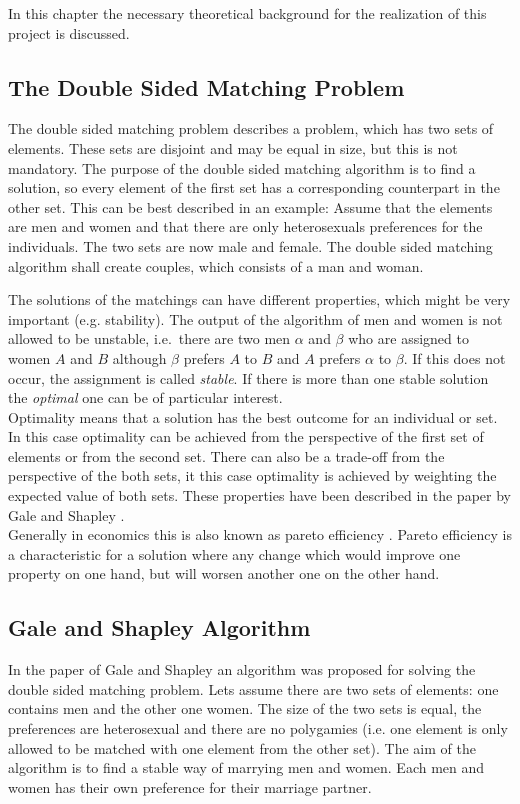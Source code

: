 \label{theory}
In this chapter the necessary theoretical background for the realization of this project is discussed.

\subsection{The Double Sided Matching Problem}
The double sided matching problem describes a problem, which has two sets of elements.
These sets are disjoint and may be equal in size, but this is not mandatory.
The purpose of the double sided matching algorithm is to find a solution, so every element of the first set has a corresponding counterpart in the other set. This can be best described in an example:
Assume that the elements are men and women and that there are only heterosexuals preferences for the individuals.
The two sets are now male and female.
The double sided matching algorithm shall create couples, which consists of a man and woman.

The solutions of the matchings can have different properties, which might be very important (e.g. stability).
The output of the algorithm of men and women is not allowed to be unstable, i.e.\ there are two men $\alpha$ and $\beta$ who are assigned to women $A$ and $B$ although $\beta$ prefers $A$ to $B$ and $A$ prefers $\alpha$ to $\beta$.
If this does not occur, the assignment is called \textit{stable}.
If there is more than one stable solution the \textit{optimal} one can be of particular interest.\\ 
Optimality means that a solution has the best outcome for an individual or set.
In this case optimality can be achieved from the perspective of the first set of elements or from the second set.
There can also be a trade-off from the perspective of the both sets, it this case optimality is achieved by weighting the expected value of both sets.
These properties have been described in the paper by Gale and Shapley \cite{gale62a}.\\
Generally in economics this is also known as pareto efficiency \cite[p. 46]{9780199297818}. 
Pareto efficiency is a characteristic for a solution where any change which would improve one property on one hand, but will worsen another one on the other hand.


\subsection{Gale and Shapley Algorithm}

In the paper of Gale and Shapley \cite{gale62a} an algorithm was proposed for solving the double sided matching problem.
Lets assume there are two sets of elements: one contains men and the other one women.
The size of the two sets is equal, the preferences are heterosexual and there are no polygamies (i.e. one element is only allowed to be matched with one element from the other set).
The aim of the algorithm is to find a stable way of marrying men and women.
Each men and women has their own preference for their marriage partner.

